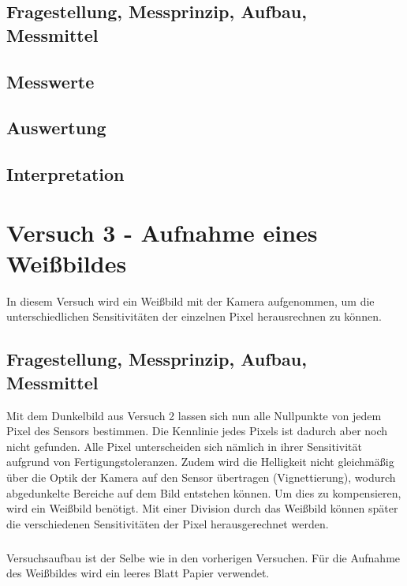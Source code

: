 \documentclass[12pt,oneside,a4paper]{report}
\begin{document}
\section{Fragestellung, Messprinzip, Aufbau, Messmittel}
\label{chap:VERSUCH_2_FRAGESTELLUNG}

\section{Messwerte}
\label{chap:VERSUCH_2_MESSWERTE}

\section{Auswertung}
\label{chap:VERSUCH_2_AUSWERTUNG}

\section{Interpretation}
\label{chap:VERSUCH_2_INTERPRETATION}

%
%
\chapter{Versuch 3 - Aufnahme eines Weißbildes}
\label{chap:VERSUCH_3}

In diesem Versuch wird ein Weißbild mit der Kamera aufgenommen, um die unterschiedlichen Sensitivitäten der einzelnen Pixel herausrechnen zu können.

\section{Fragestellung, Messprinzip, Aufbau, Messmittel}
\label{chap:VERSUCH_3_FRAGESTELLUNG}

Mit dem Dunkelbild aus Versuch 2 lassen sich nun alle Nullpunkte von jedem Pixel des Sensors bestimmen. Die Kennlinie jedes Pixels ist dadurch aber noch nicht gefunden.
Alle Pixel unterscheiden sich nämlich in ihrer Sensitivität aufgrund von Fertigungstoleranzen. Zudem wird die Helligkeit nicht gleichmäßig über die Optik der Kamera auf den Sensor übertragen (Vignettierung), wodurch abgedunkelte Bereiche auf dem Bild entstehen können. Um dies zu kompensieren, wird ein Weißbild benötigt. Mit einer Division durch das Weißbild können später die verschiedenen Sensitivitäten der Pixel herausgerechnet werden.
\paragraph{}
Versuchsaufbau ist der Selbe wie in den vorherigen Versuchen. Für die Aufnahme des Weißbildes wird ein leeres Blatt Papier verwendet.
\end{document}
